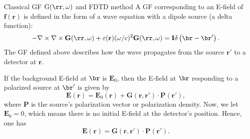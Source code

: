 \documentclass{beamer}
\begin{document}
\begin{frame}{Classical GF $\mathrm{G}(\rr,\omega)$ and FDTD method}
\fontsize{9}{-0.2}\selectfont
A GF corresponding to an E-field of $\mathbf{f}(\mathbf{r})$ is defined in the form of a wave equation with a dipole source (a delta function):
\begin{equation}
\label{def:GEwave}
 -\nabla \times \nabla \times \mathbf{G}(\rr,\omega) + \varepsilon(\mathbf{r})(\omega/c)^2 \mathbf{G}(\rr,\omega) = \mathbf{I} \delta \left(\br-\br'\right).\nonumber
\end{equation}
The GF defined above describes how the wave propagates from the source $\mathbf{r}'$ to a detector at $\mathbf{r}$.

If the background E-field at $\br$ is $\mathbf{E}_0$, then the E-field at $\br$ responding to a polarized source at $\br'$ is given by
\begin{equation}
 \label{EandGwithE0}
\mathbf{E}(\mathbf{r})=\mathbf{E}_0(\mathbf{r
})+\mathbf{G}(\mathbf{r},\mathbf{r}') \cdot \mathbf{P}(\mathbf{r}'),
\end{equation}
where $\mathbf{P}$ is the source's polarization vector or polarization density.
Now, we let $\mathbf{E}_0=0$, which means there is no initial E-field at the detector's position.
Hence, one has
\begin{equation}\label{eq:EGP}
\mathbf{E}(\mathbf{r})=\mathbf{G}(\mathbf{r},\mathbf{r}') \cdot \mathbf{P}(\mathbf{r}').
\end{equation}
\end{frame}
\end{document}
